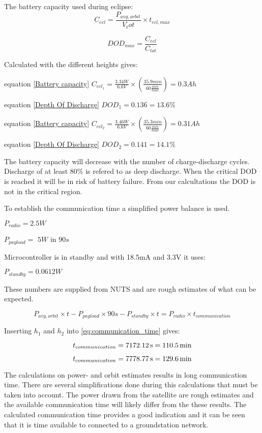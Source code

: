 The battery capacity used during eclipse: 
\begin{equation}
C_{ecl} = \frac{P_{avg,orbit}}{V_tot}\times t_{ecl,max}
\label{Battery capacity}
\end{equation}

 \begin{equation}
DOD_{max} = \frac{C_{ecl}}{C_{tot}}
\label{Depth Of Discharge}
\end{equation}

Calculated with the different heights gives:

equation \ref{Battery capacity}
$C_{ecl_1} = \frac{3.34W}{6.6V}\times(\frac{35.9min}{60\frac{min}{hour}}) = 0.3Ah$

equation \ref{Depth Of Discharge}
$DOD_1 = 0.136 = 13.6 \%$

equation \ref{Battery capacity}
$C_{ecl_2} = \frac{3.46W}{6.6V}\times(\frac{35.3min}{60\frac{min}{hour}}) = 0.31 Ah$

equation \ref{Depth Of Discharge}
$DOD_2 = 0.141 = 14.1\%$

The battery capacity will decrease with the number of charge-discharge cycles. Discharge of at least 80\% is refered to as deep discharge. When the critical DOD is reached it will be in risk of battery failure. From our calcultations the DOD is not in the critical region. 

\vspace{5 mm}To establish the communication time a simplified power balance is used. 

\vspace{5 mm}$P_{radio} = 2.5 W$

$P_{payload} =$ $5 W$  in  $90s$

Microcontroller is in standby and with 18.5mA and 3.3V it uses:

$P_{standby} = 0.0612W$ 

These numbers are supplied from NUTS and are rough estimates of what can be expected.

\begin{equation}
P_{avg,orbit}\times t - P_{payload}\times 90 s - P_{standby}\times t= P_{radio}\times t_{communication}
\label{eq:communication_time}
\end{equation}

Inserting $h_1$ and $h_2$ into \autoref{eq:communication_time} gives:

\begin{equation}
t_{communication} = \unit[7172.12]{s} =\unit[110.5]{min}
\end{equation}

\begin{equation}
t_{communication} = \unit[7778.77]{s} =\unit[129.6]{min}
\end{equation}

The calculations on power- and orbit estimates results in long communication time. There are several simplifications done during this calculations that must be taken into account. The power drawn from the satellite are rough estimates and the available communication time will likely differ from the these results. The calculated communication time provides a good indication and it can be seen that it is time available to connected to a groundstation network.
